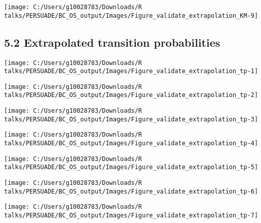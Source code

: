 \documentclass[
]{article}
\begin{document}
\begin{flushleft}\texttt{[image: C:/Users/g10028783/Downloads/R talks/PERSUADE/BC\_OS\_output/Images/Figure\_validate\_extrapolation\_KM-9]} \end{flushleft}

\clearpage

\subsection{5.2 Extrapolated transition
probabilities}\label{extrapolated-transition-probabilities}

\begin{flushleft}\texttt{[image: C:/Users/g10028783/Downloads/R talks/PERSUADE/BC\_OS\_output/Images/Figure\_validate\_extrapolation\_tp-1]} \end{flushleft}

\begin{flushleft}\texttt{[image: C:/Users/g10028783/Downloads/R talks/PERSUADE/BC\_OS\_output/Images/Figure\_validate\_extrapolation\_tp-2]} \end{flushleft}

\begin{flushleft}\texttt{[image: C:/Users/g10028783/Downloads/R talks/PERSUADE/BC\_OS\_output/Images/Figure\_validate\_extrapolation\_tp-3]} \end{flushleft}

\begin{flushleft}\texttt{[image: C:/Users/g10028783/Downloads/R talks/PERSUADE/BC\_OS\_output/Images/Figure\_validate\_extrapolation\_tp-4]} \end{flushleft}

\begin{flushleft}\texttt{[image: C:/Users/g10028783/Downloads/R talks/PERSUADE/BC\_OS\_output/Images/Figure\_validate\_extrapolation\_tp-5]} \end{flushleft}

\begin{flushleft}\texttt{[image: C:/Users/g10028783/Downloads/R talks/PERSUADE/BC\_OS\_output/Images/Figure\_validate\_extrapolation\_tp-6]} \end{flushleft}

\begin{flushleft}\texttt{[image: C:/Users/g10028783/Downloads/R talks/PERSUADE/BC\_OS\_output/Images/Figure\_validate\_extrapolation\_tp-7]} \end{flushleft}
\end{document}
